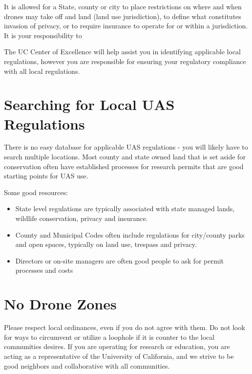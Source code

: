 \documentclass[
]{book}
\providecommand{\tightlist}{%
  \setlength{\itemsep}{0pt}\setlength{\parskip}{0pt}}
\begin{document}
It is allowed for a State, county or city to place restrictions on where and when drones may take off and land (land use jurisdiction), to define what constitutes invasion of privacy, or to require insurance to operate for or within a jurisdiction. It is your responsibility to

The UC Center of Excellence will help assist you in identifying applicable local regulations, however you are responsible for ensuring your regulatory compliance with all local regulations.

\hypertarget{searching-for-local-uas-regulations}{%
\section{Searching for Local UAS Regulations}\label{searching-for-local-uas-regulations}}

There is no easy database for applicable UAS regulations - you will likely have to search multiple locations. Most county and state owned land that is set aside for conservation often have established processes for research permits that are good starting points for UAS use.

Some good resources:

\begin{itemize}
\tightlist
\item
  State level regulations are typically associated with state managed lands, wildlife conservation, privacy and insurance.
\item
  County and Municipal Codes often include regulations for city/county parks and open spaces, typically on land use, trespass and privacy.
\item
  Directors or on-site managers are often good people to ask for permit processes and costs
\end{itemize}

\hypertarget{no-drone-zones}{%
\section{No Drone Zones}\label{no-drone-zones}}

Please respect local ordinances, even if you do not agree with them. Do not look for ways to circumvent or utilize a loophole if it is counter to the local communities desires. If you are operating for research or education, you are acting as a representative of the University of California, and we strive to be good neighbors and collaborative with all communities.
\end{document}
